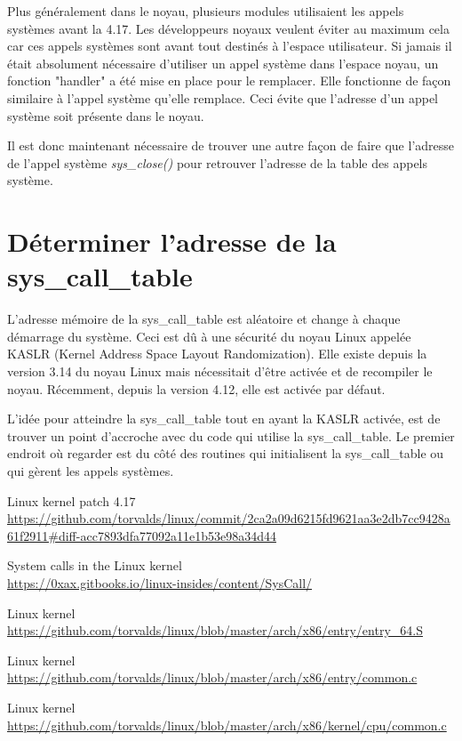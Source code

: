 \documentclass[journal, a4paper]{IEEEtran}
\begin{document}
 Plus généralement dans le noyau, plusieurs modules utilisaient les appels systèmes avant la 4.17. Les développeurs noyaux veulent éviter au maximum cela car ces appels systèmes sont avant tout destinés à l'espace utilisateur. Si jamais il était absolument nécessaire d'utiliser un appel système dans l'espace noyau, un fonction "handler" a été mise en place pour le remplacer. Elle fonctionne de façon similaire à l'appel système qu'elle remplace. Ceci évite que l'adresse d'un appel système soit présente dans le noyau.

Il est donc maintenant nécessaire de trouver une autre façon de faire que l'adresse de l'appel système \textit{sys\_close()} pour retrouver l'adresse de la table des appels système.

\section{Déterminer l'adresse de la sys\_call\_table}

L'adresse mémoire de la sys\_call\_table est aléatoire et change à chaque démarrage du système. Ceci est dû à une sécurité du noyau Linux appelée KASLR (Kernel Address Space Layout Randomization). Elle existe depuis la version 3.14 du noyau Linux mais nécessitait d'être activée et de recompiler le noyau. Récemment, depuis la version 4.12, elle est activée par défaut.

L'idée pour atteindre la sys\_call\_table tout en ayant la KASLR activée, est de trouver un point d'accroche avec du code qui utilise la sys\_call\_table. Le premier endroit où regarder est du côté des routines qui initialisent la sys\_call\_table ou qui gèrent les appels systèmes.


\begin{thebibliography}{}
	Linux kernel patch 4.17\\
	\url{https://github.com/torvalds/linux/commit/2ca2a09d6215fd9621aa3e2db7cc9428a61f2911#diff-acc7893dfa77092a11e1b53e98a34d44}

	System calls in the Linux kernel\\
	\url{https://0xax.gitbooks.io/linux-insides/content/SysCall/}

	Linux kernel\\
	\url{https://github.com/torvalds/linux/blob/master/arch/x86/entry/entry_64.S}

	Linux kernel\\
	\url{https://github.com/torvalds/linux/blob/master/arch/x86/entry/common.c}

	Linux kernel\\
	\url{https://github.com/torvalds/linux/blob/master/arch/x86/kernel/cpu/common.c}
\end{thebibliography}
\end{document}
